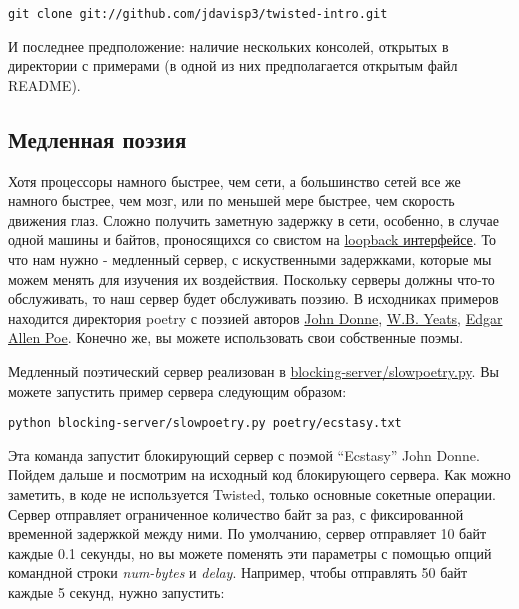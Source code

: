 \begin{verbatim}
git clone git://github.com/jdavisp3/twisted-intro.git
\end{verbatim}

И последнее предположение: наличие нескольких консолей, 
открытых в директории с примерами (в одной из них предполагается 
открытым файл README).


\subsection{Медленная поэзия}


    Хотя процессоры намного быстрее, чем сети, 
а большинство сетей все же намного быстрее, чем мозг, 
или по меньшей мере быстрее, чем скорость движения 
глаз. Сложно получить заметную задержку в сети, особенно, в случае 
одной машины и байтов, проносящихся со свистом на  
\href{http://en.wikipedia.org/wiki/Loopback}{loopback интерфейсе}. 
То что нам нужно - медленный сервер, 
с искуственными задержками, которые мы можем менять для 
изучения их воздействия. Поскольку серверы должны что-то 
обслуживать, то наш сервер будет обслуживать поэзию. 
В исходниках примеров находится директория poetry с поэзией авторов 
\href{http://en.wikipedia.org/wiki/Donne}{John Donne},
\href{http://en.wikipedia.org/wiki/Yeats}{W.B. Yeats}, 
\href{http://en.wikipedia.org/wiki/Poe}{Edgar Allen Poe}. 
Конечно же, вы можете использовать свои собственные поэмы. 


Медленный поэтический сервер реализован в 
\href{http://github.com/jdavisp3/twisted-intro/blob/master/blocking-server/slowpoetry.py}{blocking-server/slowpoetry.py}. 
Вы можете запустить пример сервера следующим образом:

\begin{verbatim}
python blocking-server/slowpoetry.py poetry/ecstasy.txt
\end{verbatim}


Эта команда запустит блокирующий сервер с 
поэмой “Ecstasy” John Donne. Пойдем дальше и посмотрим на 
исходный код блокирующего сервера. Как можно заметить, в 
коде не используется Twisted, только основные сокетные 
операции. Сервер отправляет ограниченное количество 
байт за раз, с фиксированной временной задержкой между ними. 
По умолчанию, сервер отправляет 10 байт каждые 0.1 секунды, 
но вы можете поменять эти параметры с помощью опций 
командной строки \textit{num-bytes} и 
\textit{delay}. Например, чтобы 
отправлять 50 байт каждые 5 секунд, нужно запустить: 

